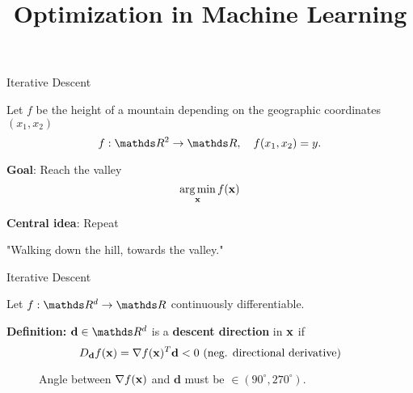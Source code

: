 \documentclass[11pt,compress,t,notes=noshow, xcolor=table]{beamer}
\title{Optimization in Machine Learning}
\begin{document}


\begin{framei}{Iterative Descent}
\item Let $f$ be the height of a mountain depending on the geographic coordinates $(x_1, x_2)$
\vspace*{-0.1cm}
$$f: \R^2 \to \R, \quad f(x_1, x_2) = y.$$
\item \textbf{Goal}: Reach the valley
$$\mathop{\mathrm{arg\,min}}_{\mathbf{x}} f(\mathbf{x})$$
\item \textbf{Central idea}: Repeat
\vspace*{-0.15cm}
{
\begin{footnotesize} "Walking down the hill, towards the valley." \end{footnotesize}}
\end{framei}

\begin{framei}{Iterative Descent}
\item Let $f: \R^d \to \R$ continuously differentiable.
\item \textbf{Definition:} $\mathbf{d}\in \R^d$ is a \textbf{descent direction} in $\mathbf{x}$ if
$$D_\mathbf{d} f(\mathbf{x}) = \nabla f(\mathbf{x}) ^T \mathbf{d} < 0 \text{ (neg. directional derivative)}$$
\begin{figure}
\begin{footnotesize}
Angle between $\nabla f(\mathbf{x})$ and $\mathbf{d}$ must be $\in (90^{\circ}, 270^{\circ})$. 
\end{footnotesize}
\end{figure}
\end{framei}
\end{document}

